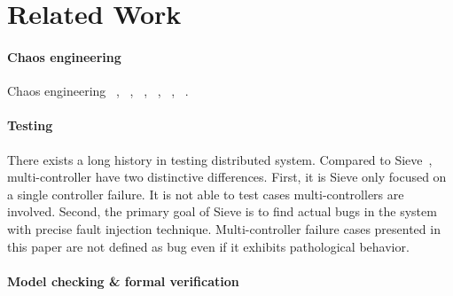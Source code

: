 \section{Related Work}
\label{sec:related_work}


\paragraph*{Chaos engineering}
Chaos engineering ~\cite{chaosengineering}, ~\cite{chaosmesh}, ~\cite{chaosmonkey}, ~\cite{chaoskube}, ~\cite{kubemonkey}, ~\cite{pumba}.

\paragraph*{Testing}
There exists a long history in testing distributed system. Compared to Sieve~\cite{sieve}, multi-controller have two distinctive differences. First, it is Sieve only focused on a single controller failure. It is not able to test cases multi-controllers are involved. Second, the primary goal of Sieve is to find actual bugs in the system with precise fault injection technique. Multi-controller failure cases presented in this paper are not defined as bug even if it exhibits pathological behavior.

\paragraph*{Model checking & formal verification}